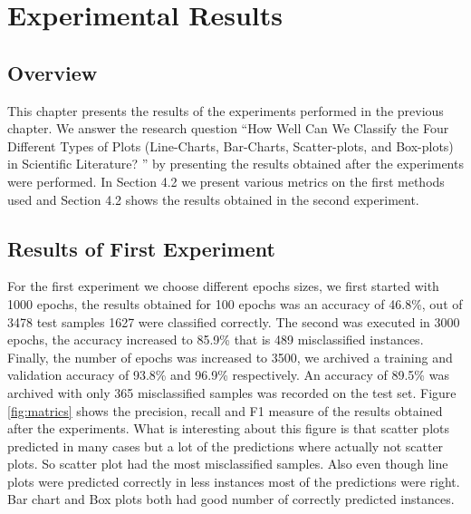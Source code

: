 \documentclass[12pt, a4paper,oneside]{report}
\begin{document}
\chapter{Experimental Results}

\section{Overview}
This chapter presents the results of the experiments performed in the previous chapter. We answer the research question
``How Well Can We Classify the Four Different Types of Plots (Line-Charts, Bar-Charts, Scatter-plots, and Box-plots) in Scientific Literature? '' by presenting the results obtained after the experiments were performed. In Section 4.2 we present various metrics on the first methods used and Section 4.2 shows the results obtained in the second experiment.

\section{Results of First Experiment}
For the first experiment we choose different epochs sizes, we first started with 1000 epochs, the results obtained for 100 epochs was an accuracy of 46.8\%, out of 3478 test samples 1627 were classified correctly. The second was executed in 3000 epochs, the accuracy increased to 85.9\% that is 489 misclassified instances. Finally, the number of epochs was increased to 3500, we archived a training and validation accuracy of 93.8\% and 96.9\% respectively. An accuracy of 89.5\% was archived with only 365 misclassified samples was recorded on the test set. Figure \ref{fig:matrics} shows the precision, recall and F1 measure of the results obtained after the experiments. What is interesting about this figure is that scatter plots predicted in many cases but a lot of the predictions where actually not scatter plots. So scatter plot had the most misclassified samples. Also even though line plots were predicted correctly in less instances most of the predictions were right. Bar chart and Box plots both had good number of correctly predicted instances.
\end{document}
